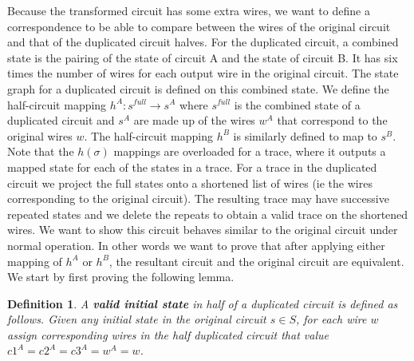 \documentclass{article}
\newtheorem*{definition}{Definition}
\begin{document}
Because the transformed circuit has some extra wires, we want to define a correspondence to be able to compare between the wires of the original circuit and that of the duplicated circuit halves.  For the duplicated circuit, a combined state is the pairing of the state of circuit A and the state of circuit B. It has six times the number of wires for each output wire in the original circuit.  The state graph for a duplicated circuit is defined on this combined state.  We define the half-circuit mapping $h^A: s^{full} \to s^A$ where $s^{full}$ is the combined state of a duplicated circuit and $s^A$ are made up of the wires $w^A$ that correspond to the original wires $w$.  The half-circuit mapping $h^B$ is similarly defined to map to $s^B$.  Note that the $h(\sigma)$ mappings are overloaded for a trace, where it outputs a mapped state for each of the states in a trace.%
For a trace in the duplicated circuit we project the full states onto a shortened list of wires (ie the wires corresponding to the original circuit). The resulting trace may have successive repeated states and we delete the repeats to obtain a valid trace on the shortened wires.  %
\newline
We want to show this circuit behaves similar to the original circuit under normal operation.  In other words we want to prove that after applying either mapping of $h^A$ or $h^B$, the resultant circuit and the original circuit are equivalent.  We start by first proving the following lemma.

\begin{definition} A \textbf{valid initial state} in half of a duplicated circuit is defined as follows.  Given any initial state in the original circuit $s \in S$, for each wire $w$ assign corresponding wires in the half duplicated circuit that value $c1^A=c2^A=c3^A=w^A=w$.
\end{definition}
\end{document}
